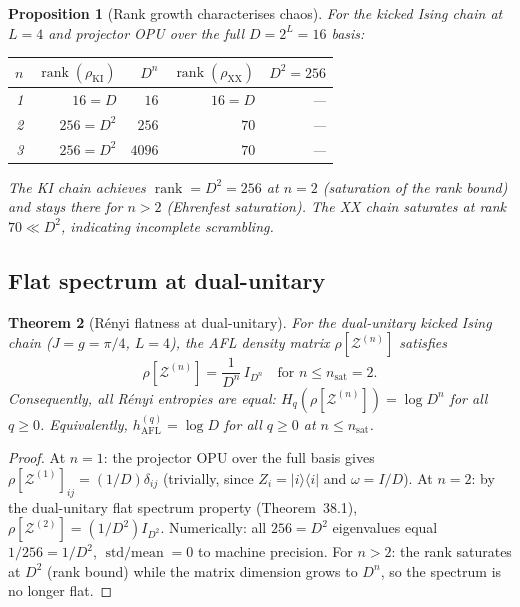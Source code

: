 \documentclass[12pt,a4paper]{article}
\newtheorem{theorem}{Theorem}[section]
\newtheorem{proposition}[theorem]{Proposition}
\begin{document}
\begin{proposition}[Rank growth characterises chaos]
  \label{prop:rank_chaos}
  For the kicked Ising chain at $L=4$ and projector OPU over the full
  $D=2^L=16$ basis:
  \begin{center}
  \begin{tabular}{r|rrrr}
  \hline
  $n$ & $\operatorname{rank}(\rho_{\mathrm{KI}})$ & $D^n$ &
       $\operatorname{rank}(\rho_{\mathrm{XX}})$ & $D^2 = 256$ \\
  \hline
  1 & $16 = D$ & $16$ & $16 = D$ & --- \\
  2 & $256 = D^2$ & $256$ & $70$ & --- \\
  3 & $256 = D^2$ & $4096$ & $70$ & --- \\
  \hline
  \end{tabular}
  \end{center}
  The KI chain achieves $\operatorname{rank} = D^2 = 256$ at $n=2$
  (saturation of the rank bound) and stays there for $n>2$ (Ehrenfest
  saturation).  The XX chain saturates at rank $70 \ll D^2$, indicating
  incomplete scrambling.
\end{proposition}

\subsection{Flat spectrum at dual-unitary}

\begin{theorem}[R\'enyi flatness at dual-unitary]
  \label{thm:renyi_flat}
  For the dual-unitary kicked Ising chain ($J=g=\pi/4$, $L=4$), the
  AFL density matrix $\rho[\mathcal{Z}^{(n)}]$ satisfies
  \[
    \rho[\mathcal{Z}^{(n)}] = \frac{1}{D^n}\,I_{D^n}
    \quad \text{for } n \leq n_{\mathrm{sat}} = 2.
  \]
  Consequently, \emph{all R\'enyi entropies are equal}:
  $H_q(\rho[\mathcal{Z}^{(n)}]) = \log D^n$ for all $q\geq 0$.
  Equivalently, $h_{\mathrm{AFL}}^{(q)} = \log D$ for all $q\geq 0$
  at $n\leq n_{\mathrm{sat}}$.
\end{theorem}
\begin{proof}
  At $n=1$: the projector OPU over the full basis gives
  $\rho[\mathcal{Z}^{(1)}]_{ij} = (1/D)\delta_{ij}$ (trivially, since
  $Z_i = |i\rangle\langle i|$ and $\omega = I/D$).
  At $n=2$: by the dual-unitary flat spectrum property
  (Theorem~38.1), $\rho[\mathcal{Z}^{(2)}] = (1/D^2)I_{D^2}$.
  Numerically: all $256 = D^2$ eigenvalues equal $1/256 = 1/D^2$,
  $\operatorname{std/mean} = 0$ to machine precision.
  For $n>2$: the rank saturates at $D^2$ (rank bound) while the
  matrix dimension grows to $D^n$, so the spectrum is no longer flat.
\end{proof}
\end{document}
